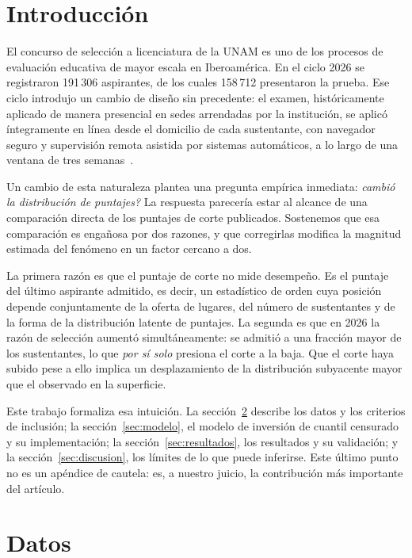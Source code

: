 \documentclass[aps,prd,reprint,amsmath,amssymb,nofootinbib,superscriptaddress]{revtex4-2}
\begin{document}
\section{Introducci\'on}

El concurso de selecci\'on a licenciatura de la UNAM es uno de los
procesos de evaluaci\'on educativa de mayor escala en Iberoam\'erica. En
el ciclo 2026 se registraron 191\,306 aspirantes, de los cuales 158\,712
presentaron la prueba. Ese ciclo introdujo un cambio de dise\~no sin
precedente: el examen, hist\'oricamente aplicado de manera presencial en
sedes arrendadas por la instituci\'on, se aplic\'o \'integramente en
l\'inea desde el domicilio de cada sustentante, con navegador seguro y
supervisi\'on remota asistida por sistemas autom\'aticos, a lo largo de
una ventana de tres semanas~\cite{gaceta2026}.

Un cambio de esta naturaleza plantea una pregunta emp\'irica inmediata:
\emph{\textquestiondown cambi\'o la distribuci\'on de puntajes?} La
respuesta parecer\'ia estar al alcance de una comparaci\'on directa de los
puntajes de corte publicados. Sostenemos que esa comparaci\'on es
enga\~nosa por dos razones, y que corregirlas modifica la magnitud
estimada del fen\'omeno en un factor cercano a dos.

La primera raz\'on es que el puntaje de corte no mide desempe\~no. Es el
puntaje del \'ultimo aspirante admitido, es decir, un estad\'istico de
orden cuya posici\'on depende conjuntamente de la oferta de lugares, del
n\'umero de sustentantes y de la forma de la distribuci\'on latente de
puntajes. La segunda es que en 2026 la raz\'on de selecci\'on aument\'o
simult\'aneamente: se admiti\'o a una fracci\'on mayor de los
sustentantes, lo que \emph{por s\'i solo} presiona el corte a la baja.
Que el corte haya subido pese a ello implica un desplazamiento de la
distribuci\'on subyacente mayor que el observado en la superficie.

Este trabajo formaliza esa intuici\'on. La secci\'on~\ref{sec:datos}
describe los datos y los criterios de inclusi\'on; la
secci\'on~\ref{sec:modelo}, el modelo de inversi\'on de cuantil censurado
y su implementaci\'on; la secci\'on~\ref{sec:resultados}, los resultados y
su validaci\'on; y la secci\'on~\ref{sec:discusion}, los l\'imites de lo
que puede inferirse. Este \'ultimo punto no es un ap\'endice de cautela:
es, a nuestro juicio, la contribuci\'on m\'as importante del art\'iculo.

\section{Datos}\label{sec:datos}
\end{document}
